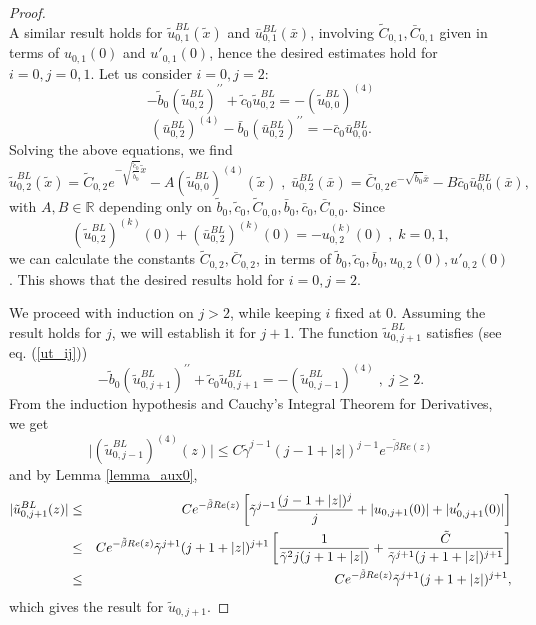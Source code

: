 \documentclass[12pt]{article}
\begin{document}
\begin{proof}
\[\]
A similar result holds for $\tilde{u}^{BL}_{0,1}(\tilde{x})$ and $\bar{u}^{BL}_{0,1}(\bar{x})$, involving 
$\tilde{C}_{0,1}, \bar{C}_{0,1}$ given in terms of $u_{0,1}(0)$ and $u'_{0,1}(0)$, hence the desired estimates 
hold for $i=0,j=0,1$. Let us consider $i=0,j=2$: 
%
\[
-\tilde{b}_0 \left(\tilde{u}^{BL}_{0,2}\right)^{\prime \prime} + \tilde{c}_0 \tilde{u}^{BL}_{0,2} = - \left(\tilde{u}^{BL}_{0,0}\right)^{(4)}
\]
%
\[
\left( \bar{u}^{BL}_{0,2}\right)^{(4)} - \bar{b}_0 \left(\bar{u}^{BL}_{0,2} \right)^{\prime \prime}= - \bar{c}_0 \bar{u}^{BL}_{0,0}.
\]
Solving the above equations, we find
%
\[
\tilde{u}^{BL}_{0,2}(\tilde{x}) = \tilde{C}_{0,2} e^{-\sqrt{\frac{\tilde{c}_0}{\tilde{b}_0}} \tilde{x}} - A \left(\tilde{u}^{BL}_{0,0}\right)^{(4)}(\tilde{x})\; , \;
\bar{u}^{BL}_{0,2}(\bar{x}) = \bar{C}_{0,2} e^{-\sqrt{\bar{b}_0} \bar{x}} - B \bar{c}_0 \bar{u}^{BL}_{0,0}(\bar{x}),
\]
with $A, B \in \mathbb{R}$ depending only on $\tilde{b}_0, \tilde{c}_0, \tilde{C}_{0,0}, \bar{b}_0, \bar{c}_0, \bar{C}_{0,0}$. Since 
%
\[
\left(\tilde{u}^{BL}_{0,2}\right)^{(k)}(0) + \left(\bar{u}^{BL}_{0,2}\right)^{(k)}(0) = - u^{(k)}_{0,2}(0) \; , \; k=0,1,
\]
%
we can calculate the constants $\tilde{C}_{0,2}, \bar{C}_{0,2}$, in terms of $\tilde{b}_0, \tilde{c}_0, \bar{b}_0, u_{0,2}(0), u'_{0,2}(0)$. This shows that the desired results hold for $i=0,j=2$.

We proceed with 
induction on $j>2$, while keeping $i$ fixed at 0. Assuming the result holds for $j$, we will establish it
for $j+1$. The function $\tilde{u}^{BL}_{0,j+1}$ satisfies (see eq. (\ref{ut_ij}))
%
\[
-\tilde{b}_{0}\left(\tilde{u}^{BL}_{0,j+1}\right)^{\prime \prime }+\tilde{c}_{0}\tilde{u}^{BL}_{0,j+1}=-%
\left(\tilde{u}^{BL}_{0,j-1}\right)^{(4)} \; , \; j\geq 2.
\]
From the induction hypothesis and Cauchy's Integral Theorem for Derivatives, we get
%
\[
\vert \left(\tilde{u}^{BL}_{0,j-1}\right)^{(4)}(z) \vert \leq C \tilde{\gamma}^{j-1} (j-1+|z|)^{j-1} e^{-\tilde{\beta} Re(z)}
\]
and by Lemma \ref{lemma_aux0},
%
\begin{eqnarray*}
\vert \tilde{u}^{BL}_{0,j+1} (z) \vert &\leq& C e^{-\tilde{\beta} Re(z)} \left[ \tilde{\gamma}^{j-1} \frac{(j-1+|z|)^{j}}{j} +
|u_{0,j+1}(0)| + |u'_{0,j+1}(0)| \right]  \notag \\
&\leq& C e^{-\tilde{\beta} Re(z)} \tilde{\gamma}^{j+1} (j+1+|z|)^{j+1}\left[ \frac{1}{\tilde{\gamma}^2 j (j+1+|z|)} + \frac{\tilde{C}}{\tilde{\gamma}^{j+1} (j+1+|z|)^{j+1}} \right] \\
&\leq& C e^{-\tilde{\beta} Re(z)} \tilde{\gamma}^{j+1} (j+1+|z|)^{j+1},
\end{eqnarray*}
%
which gives the result for $\tilde{u}_{0,j+1}$.


\end{proof}
\end{document}
